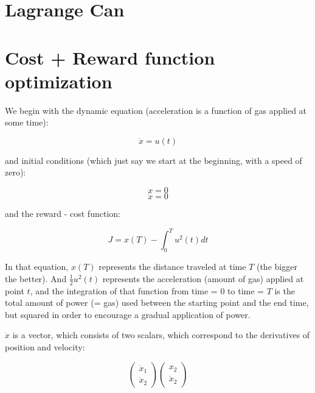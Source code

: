\documentclass[11pt]{report}
\begin{document}

\section{Lagrange Can}







\section{Cost + Reward function optimization}

We begin with the dynamic equation (acceleration is a function of gas applied at some time):

\[ \ddot{x} = u(t) \]

and initial conditions (which just say we start at the beginning, with a speed of zero):

\[ x = 0 \]
\[ \dot{x} = 0 \]

and the reward - cost function:

\[ J = x(T) -  \int^T_0 u^2(t) dt \]

In that equation, $x(T)$ represents the distance traveled at time $T$ (the bigger the better). And $\frac{1}{2} u^2(t)$ represents the acceleration (amount of gas) applied at point $t$, and the integration of that function from time = 0 to time = $T$ is the total amount of power (= gas) used between the starting point and the end time, but squared in order to encourage a gradual application of power.

$\dot{x}$ is a vector, which consists of two scalars, which correspond to the derivatives of position and velocity:

\[
  \begin{pmatrix}
    \dot{x}_1\\
    \dot{x}_2
  \end{pmatrix}
  \begin{pmatrix}
    x_2\\
    \dot{x}_2
  \end{pmatrix}
\]
\end{document}
